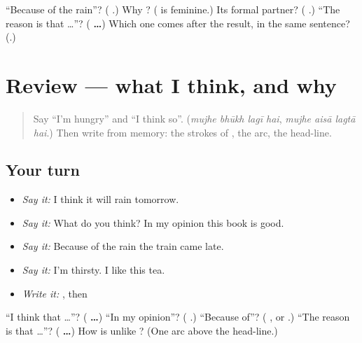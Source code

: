 \begin{tcolorbox}[breakable,colback=teal!4,colframe=teal!35!black,title={Before you move on}]
\textquotedblleft{}Because of the rain\textquotedblright{}? (\textbf{   }.) Why \textbf{}? (\textbf{} is feminine.) Its formal partner? (\textbf{ }.) \textquotedblleft{}The reason is that …\textquotedblright{}? (\textbf{    …}) Which one comes after the result, in the same sentence? (\textbf{}.)
\end{tcolorbox}
\section[(review)]{Review — what I think, and why}

\label{lesson:HI-R280-opinion-and-reason}



\begin{quote}
Say \textquotedblleft{}I'm hungry\textquotedblright{} and \textquotedblleft{}I think so\textquotedblright{}. (\emph{mujhe bhūkh lagī hai}, \emph{mujhe aisā lagtā hai}.) Then write \textbf{} from memory: the strokes of \textbf{}, the arc, the head-line.
\end{quote}

\subsection*{Your turn}
\begin{itemize}
\raggedright
  \item \emph{Say it:} I think it will rain tomorrow.
  \item \emph{Say it:} What do you think? In my opinion this book is good.
  \item \emph{Say it:} Because of the rain the train came late.
  \item \emph{Say it:} I'm thirsty. I like this tea.
  \item \emph{Write it:} \textbf{}, then \textbf{   }
\end{itemize}

\begin{tcolorbox}[breakable,colback=teal!4,colframe=teal!35!black,title={Before you move on}]
\textquotedblleft{}I think that …\textquotedblright{}? (\textbf{    …}) \textquotedblleft{}In my opinion\textquotedblright{}? (\textbf{  }.) \textquotedblleft{}Because of\textquotedblright{}? (\textbf{  }, or \textbf{ }.) \textquotedblleft{}The reason is that …\textquotedblright{}? (\textbf{    …}) How is \textbf{} unlike \textbf{}? (One arc above the head-line.)
\end{tcolorbox}
